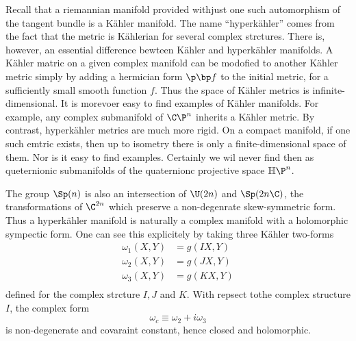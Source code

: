 \documentclass{worksheetclass}
\begin{document}
        \begin{remark}
            Recall that a riemannian manifold provided withjust one such automorphism of the tangent bundle is a Kähler manifold. The name ``hyperkähler'' comes from the fact that the metric is Kählerian for several complex strctures. There is, however, an essential difference bewteen Kähler and hyperkähler manifolds. A Kähler matric on a given complex manifold  can be modofied to another Kähler metric simply by adding a hermician form $\p\bp f$ to the initial metric, for a sufficiently small smooth function $f$. Thus the space of Kähler metrics is infinite-dimensional. It is morevoer easy to find examples of Kähler manifolds. For example, any complex submanifold of $\C\P^n$ inherits a Kähler metric. By contrast, hyperkähler metrics are much more rigid. On a compact manifold, if one such emtric exists, then up to isometry there is only a finite-dimensional space of them. Nor is it easy to find examples. Certainly we wil never find then as queternionic submanifolds of the quaternionc projective space $\mathbb{H}\P^n$.
        \end{remark}
        The group $\Sp(n)$ is also an intersection of $\U(2n)$ and $\Sp(2n\C)$, the transformations of $\C^{2n}$ which preserve a non-degenrate skew-symmetric form. Thus a hyperkähler manifold is naturally a complex manifold with a holomorphic sympectic form. One can see this explicitely by taking three Kähler two-forms
        \begin{align}
            \omega_1(X,Y) &= g(IX,Y)\\
            \omega_2(X,Y) &= g(JX,Y)\\
            \omega_3(X,Y) &= g(KX,Y)\\
        \end{align}
        defined for the complex strcture $I,J$ and $K$. With repsect tothe complex structure $I$, the complex form
        \begin{equation}
            \omega_c \equiv \omega_2+i\omega_3
        \end{equation}
        is non-degenerate and covaraint constant, hence closed and holomorphic.
\end{document}
